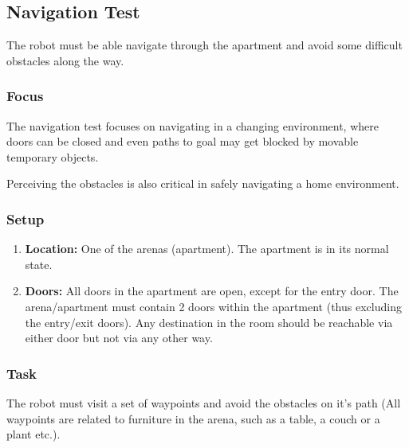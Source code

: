 \subsection{Navigation Test}

The robot must be able navigate through the apartment and avoid some difficult obstacles along the way.

\subsubsection{Focus}
The navigation test focuses on navigating in a changing environment, where doors can be closed and even paths to goal may get blocked by movable temporary objects. 

Perceiving the obstacles is also critical in safely navigating a home environment.

\subsubsection{Setup}

\begin{enumerate}
\item \textbf{Location:} One of the arenas (apartment). The apartment is in its normal state.
\item \textbf{Doors:} All doors in the apartment are open, except for the entry door. The arena/apartment must contain 2 doors within the apartment (thus excluding the entry/exit doors). Any destination in the room should be reachable via either door but not via any other way.
\end{enumerate}

\subsubsection{Task}
The robot must visit a set of waypoints and avoid the obstacles on it's path (All waypoints are related to furniture in the arena, such as a table, a couch or a plant etc.). 

